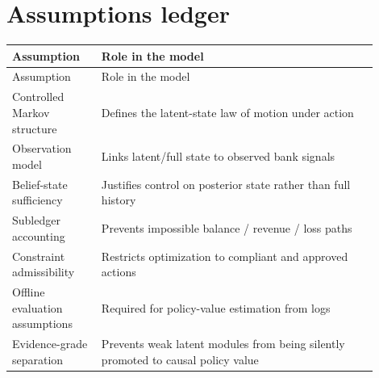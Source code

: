 \documentclass[11pt]{article}
\newcommand{\1}{\mathbf{1}}
\theoremstyle{definition}
\begin{document}
\section{Assumptions ledger}

\begin{longtable}{L{0.22\linewidth}L{0.68\linewidth}}
\toprule
Assumption & Role in the model \\
\midrule
\endfirsthead
\toprule
Assumption & Role in the model \\
\midrule
\endhead
Controlled Markov structure & Defines the latent-state law of motion under action \\
Observation model & Links latent/full state to observed bank signals \\
Belief-state sufficiency & Justifies control on posterior state rather than full history \\
Subledger accounting & Prevents impossible balance / revenue / loss paths \\
Constraint admissibility & Restricts optimization to compliant and approved actions \\
Offline evaluation assumptions & Required for policy-value estimation from logs \\
Evidence-grade separation & Prevents weak latent modules from being silently promoted to causal policy value \\
\bottomrule
\end{longtable}



\end{document}
